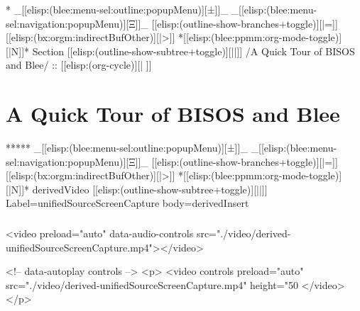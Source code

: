 \begin{whenOrg}
\begin{verblatex}
\begin{frame}[fragile,plain,label=figmmDocProductionContext]
{}


\end{frame}
\end{verblatex}

\begin{whenOrg}
*  _[[elisp:(blee:menu-sel:outline:popupMenu)][±]]_ _[[elisp:(blee:menu-sel:navigation:popupMenu)][Ξ]]_ [[elisp:(outline-show-branches+toggle)][|=]] [[elisp:(bx:orgm:indirectBufOther)][|>]] *[[elisp:(blee:ppmm:org-mode-toggle)][|N]]*  Section    [[elisp:(outline-show-subtree+toggle)][||]]   /A Quick Tour of BISOS and Blee/ ::  [[elisp:(org-cycle)][| ]]
\end{whenOrg}

\section{A Quick Tour of BISOS and Blee}


\begin{whenOrg}
*****  _[[elisp:(blee:menu-sel:outline:popupMenu)][±]]_ _[[elisp:(blee:menu-sel:navigation:popupMenu)][Ξ]]_ [[elisp:(outline-show-branches+toggle)][|=]] [[elisp:(bx:orgm:indirectBufOther)][|>]] *[[elisp:(blee:ppmm:org-mode-toggle)][|N]]*  derivedVideo [[elisp:(outline-show-subtree+toggle)][||]] Label=unifiedSourceScreenCapture  body=derivedInsert
\end{whenOrg}

\begin{htmlonly}

\begin{frame}[fragile,plain,label=unifiedSourceScreenCapture]
    \frametitle{}
    \framesubtitle{}
    \begin{presentationMode}
    \begin{rawhtml}
<video preload="auto" data-audio-controls src="./video/derived-unifiedSourceScreenCapture.mp4"></video>
    \end{rawhtml}
    \end{presentationMode}

    \begin{articleMode}
    \begin{rawhtml}
    <!-- data-autoplay  controls -->
    <p>
    <video controls  preload="auto" src="./video/derived-unifiedSourceScreenCapture.mp4" height="50%
    </video>
    </p>
     \end{rawhtml}
    \end{articleMode}
\end{frame}
\end{htmlonly}


\end{whenOrg}
